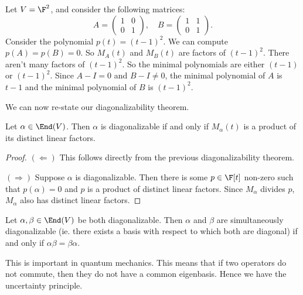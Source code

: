 \documentclass[a4paper]{article}
\begin{document}
\begin{eg}
  Let $V = \F^2$, and consider the following matrices:
  \[
    A =
    \begin{pmatrix}
      1 & 0\\
      0 & 1
    \end{pmatrix},\quad
    B =
    \begin{pmatrix}
      1 & 1\\
      0 & 1
    \end{pmatrix}.
  \]
  Consider the polynomial $p(t) = (t - 1)^2$. We can compute $p(A) = p(B) = 0$. So $M_A(t)$ and $M_B(t)$ are factors of $(t - 1)^2$. There aren't many factors of $(t - 1)^2$. So the minimal polynomials are either $(t - 1)$ or $(t - 1)^2$. Since $A - I = 0$ and $B - I \not= 0$, the minimal polynomial of $A$ is $t - 1$ and the minimal polynomial of $B$ is $(t - 1)^2$.
\end{eg}

We can now re-state our diagonalizability theorem.
\begin{thm}
  Let $\alpha \in \End(V)$. Then $\alpha$ is diagonalizable if and only if $M_\alpha(t)$ is a product of its distinct linear factors.
\end{thm}

\begin{proof}
  $(\Leftarrow)$ This follows directly from the previous diagonalizability theorem.

  $(\Rightarrow)$ Suppose $\alpha$ is diagonalizable. Then there is some $p\in \F[t]$ non-zero such that $p(\alpha) = 0$ and $p$ is a product of distinct linear factors. Since $M_\alpha$ divides $p$, $M_\alpha$ also has distinct linear factors.
\end{proof}

\begin{thm}[]
  Let $\alpha, \beta \in \End(V)$ be both diagonalizable. Then $\alpha$ and $\beta$ are simultaneously diagonalizable (ie. there exists a basis with respect to which both are diagonal) if and only if $\alpha\beta = \beta\alpha$.
\end{thm}
This is important in quantum mechanics. This means that if two operators do not commute, then they do not have a common eigenbasis. Hence we have the uncertainty principle.
\end{document}
